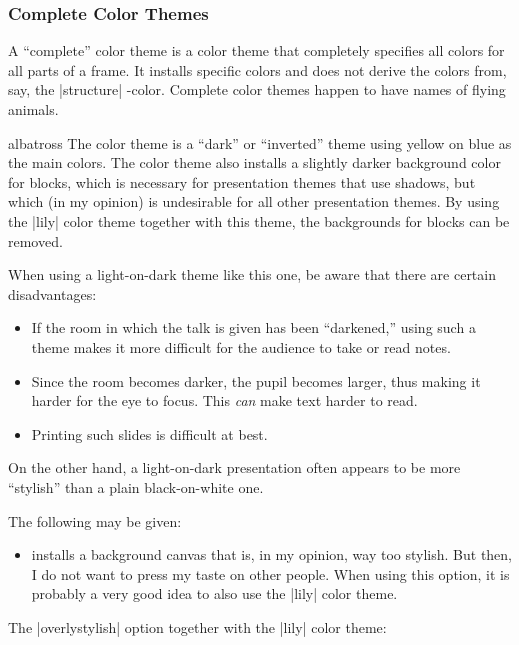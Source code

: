 \subsubsection{Complete Color Themes}

A ``complete'' color theme is a color theme that completely specifies
all colors for all parts of a frame. It installs specific colors and
does not derive the colors from, say, the |structure| \beamer-color.
Complete color themes happen to have names of flying animals.

\begin{colorthemeexample}{albatross}
  The color theme is a ``dark'' or ``inverted'' theme using yellow on
  blue as the main colors. The color theme also installs a slightly
  darker background color for blocks, which is necessary for
  presentation themes that use shadows, but which (in my opinion) is
  undesirable for all other presentation themes. By using the |lily|
  color theme together with this theme, the backgrounds for blocks can
  be removed.

  When using a light-on-dark theme like this one, be aware that there
  are certain disadvantages:
  \begin{itemize}
  \item
    If the room in which the talk is given has been ``darkened,''
    using such a theme makes it more difficult for the audience to
    take or read notes.
  \item
    Since the room becomes darker, the pupil becomes larger, thus
    making it harder for the eye to focus. This \emph{can} make text
    harder to  read.
  \item
    Printing such slides is difficult at best.
  \end{itemize}

  On the other hand, a light-on-dark presentation often appears to be
  more ``stylish''  than a plain black-on-white one.

  The following  may be given:
  \begin{itemize}
  \item {} installs a background canvas that
    is, in my opinion, way too stylish. But then, I do not want
    to press my taste on other people. When using this option, it is
    probably a very good idea to also use the |lily| color theme.      
  \end{itemize}

  \example The |overlystylish| option together with the |lily| color theme:
\end{colorthemeexample}


